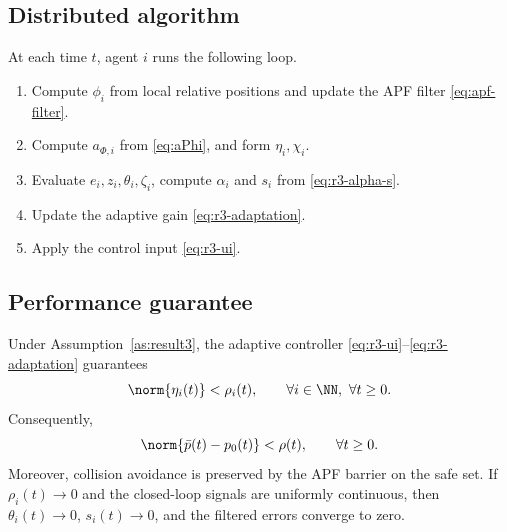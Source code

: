 \subsection{Distributed algorithm}

At each time $t$, agent $i$ runs the following loop.
\begin{enumerate}
    \item Compute $\phi_i$ from local relative positions and update the APF
    filter \eqref{eq:apf-filter}.

    \item Compute $a_{\Phi,i}$ from \eqref{eq:aPhi}, and form
    $\eta_i,\chi_i$.

    \item Evaluate $e_i,z_i,\theta_i,\zeta_i$, compute $\alpha_i$ and
    $s_i$ from \eqref{eq:r3-alpha-s}.

    \item Update the adaptive gain \eqref{eq:r3-adaptation}.

    \item Apply the control input \eqref{eq:r3-ui}.
\end{enumerate}

\subsection{Performance guarantee}

\begin{theorem}
\label{thm:result3}
Under Assumption~\ref{as:result3}, the adaptive controller
\eqref{eq:r3-ui}--\eqref{eq:r3-adaptation} guarantees
\[
\norm{\eta_i(t)}<\rho_i(t),\qquad \forall i\in\NN,\ \forall t\ge0.
\]
Consequently,
\[
\norm{\bar p(t)-p_0(t)}<\rho(t),\qquad \forall t\ge0.
\]
Moreover, collision avoidance is preserved by the APF barrier on the safe
set.  If $\rho_i(t)\to0$ and the closed-loop signals are uniformly
continuous, then $\theta_i(t)\to0$, $s_i(t)\to0$, and the filtered errors
converge to zero.
\end{theorem}

